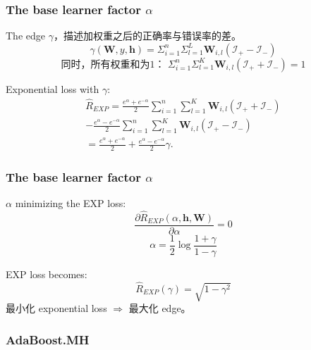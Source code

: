 \documentclass{beamer}
\begin{document}
\begin{frame}
\frametitle{The base learner factor $\alpha$}
The edge $\gamma$，描述加权重之后的正确率与错误率的差。 \\
$$ \gamma(\mathbf{W}, y, \mathbf{h}) = \Sigma_{i=1}^{n} \Sigma_{l=1}^{L} \mathbf{W}_{i,l} (\mathcal{I}_+ - \mathcal{I}_-)$$
$$\text{同时，所有权重和为1： } \Sigma_{i=1}^{n} \Sigma_{l=1}^{K}\mathbf{W}_{i,l}(\mathcal{I}_+ + \mathcal{I}_-) = 1$$
\begin{block}{Exponential loss with $\gamma$:}
$$ \begin{array}{c}
\hat{R}_{EXP} = \frac{e^\alpha + e^{-\alpha}}{2}\sum_{i=1}^{n} \sum_{l=1}^{K}\mathbf{W}_{i,l}(\mathcal{I}_+ + \mathcal{I}_-) \\
 - \frac{e^\alpha - e^{-\alpha}}{2}\sum_{i=1}^{n}\sum_{l=1}^{K}\mathbf{W}_{i,l}(\mathcal{I}_+ - \mathcal{I}_-) \\
 = \frac{e^\alpha + e^{-\alpha}}{2} + \frac{e^\alpha - e^{-\alpha}}{2}\gamma.
\end{array} $$
\end{block}
\end{frame}


\begin{frame}
\frametitle{The base learner factor $\alpha$}
\begin{block}{$\alpha$ minimizing the EXP loss:}
$$\frac{\partial \hat{R}_{EXP}(\alpha, \mathbf{h}, \mathbf{W})}{\partial \alpha} = 0$$
$$\alpha = \frac{1}{2} \log \frac{1+\gamma}{1-\gamma}$$
\end{block}

\pause

\begin{block}{EXP loss becomes:}
$$\hat{R}_{EXP}(\gamma) = \sqrt{1 - \gamma^2}$$
最小化 exponential loss $\Rightarrow$ 最大化 edge。
\end{block}

\end{frame}

\begin{frame}
\frametitle{AdaBoost.MH}
\begin{algorithm}[H]
\end{algorithm}
\end{frame}
\end{document}

